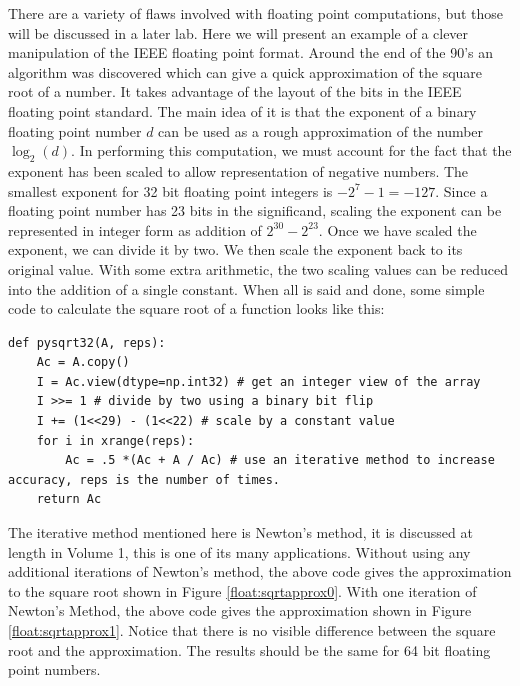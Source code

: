 There are a variety of flaws involved with floating point computations, but those will be discussed in a later lab.
Here we will present an example of a clever manipulation of the IEEE floating point format.
Around the end of the 90's an algorithm was discovered which can give a quick approximation of the square root of a number.
It takes advantage of the layout of the bits in the IEEE floating point standard.
The main idea of it is that the exponent of a binary floating point number $d$ can be used as a rough approximation of the number $\log_2\left(d\right)$.
In performing this computation, we must account for the fact that the exponent has been scaled to allow representation of negative numbers.
The smallest exponent for 32 bit floating point integers is $-2^7 - 1 = -127$.
Since a floating point number has 23 bits in the significand, scaling the exponent can be represented in integer form as addition of $2^{30} - 2^{23}$.
Once we have scaled the exponent, we can divide it by two.
We then scale the exponent back to its original value.
With some extra arithmetic, the two scaling values can be reduced into the addition of a single constant.
When all is said and done, some simple code to calculate the square root of a function looks like this:
\begin{lstlisting}
def pysqrt32(A, reps):
    Ac = A.copy()
    I = Ac.view(dtype=np.int32) # get an integer view of the array
    I >>= 1 # divide by two using a binary bit flip
    I += (1<<29) - (1<<22) # scale by a constant value
    for i in xrange(reps):
        Ac = .5 *(Ac + A / Ac) # use an iterative method to increase accuracy, reps is the number of times.
    return Ac
\end{lstlisting}
The iterative method mentioned here is Newton's method, it is discussed at length in Volume 1, this is one of its many applications.
Without using any additional iterations of Newton's method, the above code gives the approximation to the square root shown in Figure \ref{float:sqrtapprox0}.
With one iteration of Newton's Method, the above code gives the approximation shown in Figure \ref{float:sqrtapprox1}.
Notice that there is no visible difference between the square root and the approximation.
The results should be the same for 64 bit floating point numbers.

